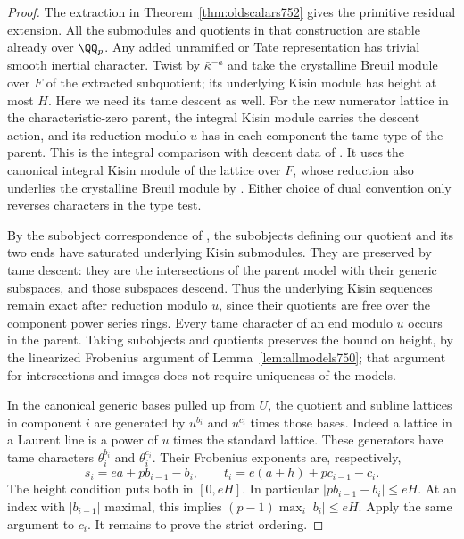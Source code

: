 \documentclass[a4paper,11pt]{article}
\theoremstyle{definition}
\theoremstyle{remark}
\numberwithin{equation}{section}
\begin{document}
\begin{proof}
The extraction in Theorem~\ref{thm:oldscalars752} gives the
primitive residual extension. All the submodules and quotients
in that construction are stable already over \(\QQ_p\).
Any added unramified or Tate representation has trivial smooth
inertial character. Twist by \(\bar\kappa^{-a}\) and take
the crystalline Breuil module over \(F\) of the extracted
subquotient; its underlying Kisin module has height at most \(H\).
Here we need its tame descent as well. For the new numerator
lattice in the characteristic-zero parent, the integral Kisin
module carries the descent action, and its reduction modulo
\(u\) has in each component the tame type of the parent.
This is the integral comparison with descent data of
\cite[Definition~3.6 and Propositions~5.16--5.17]{III-II-caraianilevin753}.
It uses the canonical integral Kisin module of the lattice over
\(F\), whose reduction also underlies the crystalline Breuil
module by \cite[Theorem~2.1.5]{III-II-bcgntmonodromy752}. Either choice
of dual convention only reverses characters in the type test.

By the subobject correspondence of
\cite[Theorem~2.1.4]{III-II-bcgntmonodromy752}, the subobjects defining
our quotient and its two ends have saturated underlying Kisin
submodules. They are preserved by tame descent: they are the
intersections of the parent model with their generic subspaces,
and those subspaces descend. Thus the underlying Kisin sequences
remain exact after reduction modulo \(u\), since their quotients
are free over the component power series rings. Every tame
character of an end modulo \(u\) occurs in the parent. Taking
subobjects and quotients preserves the bound on height, by the
linearized Frobenius argument of Lemma~\ref{lem:allmodels750};
that argument for intersections and images does not require
uniqueness of the models.

In the canonical generic bases pulled up from \(U\), the
quotient and subline lattices in component \(i\) are generated
by \(u^{b_i}\) and \(u^{c_i}\) times those bases. Indeed a
lattice in a Laurent line is a power of \(u\) times the standard
lattice. These generators have tame characters
\(\theta_i^{b_i}\) and \(\theta_i^{c_i}\). Their Frobenius
exponents are, respectively,
\[
                  s_i=ea+p b_{i-1}-b_i,\qquad
                  t_i=e(a+h)+p c_{i-1}-c_i .
\]
The height condition puts both in \([0,eH]\). In particular
\(\lvert p b_{i-1}-b_i\rvert\le eH\). At an index with
\(\lvert b_{i-1}\rvert\) maximal, this implies
\((p-1)\max_i\lvert b_i\rvert\le eH\). Apply the same argument
to \(c_i\). It remains to prove the strict ordering.


\end{proof}
\end{document}
